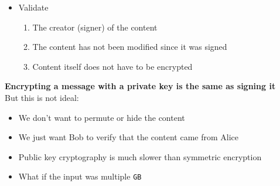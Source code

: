 \documentclass{easyclass}
\begin{document}
    \begin{lem}{}
        \begin{itemize}
            \item Validate
            \begin{enumerate}
                \item The creator (signer) of the content
                \item The content has not been modified since it was signed
                \item Content itself does not have to be encrypted
            \end{enumerate}
        \end{itemize}
        \textbf{Encrypting a message with a private key is the same as signing it} \\
        But this is not ideal:
        \begin{itemize}
            \item We don't want to permute or hide the content
            \item We just want Bob to verify that the content came from Alice
            \item Public key cryptography is much slower than symmetric encryption
            \item What if the input was multiple \texttt{GB}
        \end{itemize}
    \end{lem}
\end{document}
